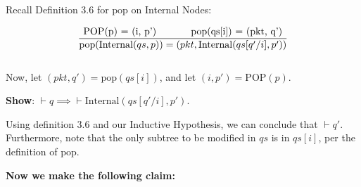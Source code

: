 \documentclass{article}
\begin{document}
\noindent Recall Definition 3.6 for $\text{pop}$ on Internal Nodes:

$$\frac{\text{POP(p) = (i, p') \hspace{1cm} \text{pop}(qs[i]) = (pkt, q')}}{{\text{pop}(\text{Internal}(qs, p)) = (pkt, \text{Internal}(qs[q'/i], p'))}}$$\\[-10pt]

\noindent Now, let $(pkt, q') = \text{pop}(qs[i])$, and let $(i, p') = \text{POP}(p)$.\newline

\noindent \textbf{Show}: $\vdash q \implies \vdash \text{Internal}(qs[q'/i], p')$.\newline

\noindent Using definition 3.6 and our Inductive Hypothesis, we can conclude that $\vdash q'$. Furthermore, note that the only subtree to be modified in $qs$ is in $qs[i]$, per the definition of $\text{pop}$.\newline

\noindent \textbf{Now we make the following claim:}\\[-20pt]
\end{document}
